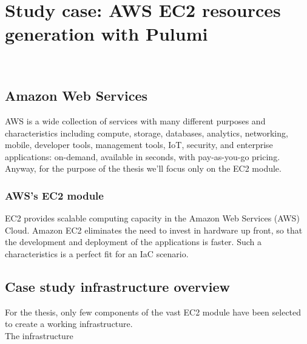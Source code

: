 
\chapter{Study case: AWS EC2 resources generation with Pulumi}
\label{cap:case-study}

\\

\section{Amazon Web Services}
AWS is a wide collection of services with many different purposes and characteristics including compute, storage, databases, analytics, networking, mobile, developer tools, management tools, IoT, security, and enterprise applications: on-demand, available in seconds, with pay-as-you-go pricing.
Anyway, for the purpose of the thesis we'll focus only on the EC2 module.

\subsection{AWS's EC2 module}
EC2 provides scalable computing capacity in the Amazon Web Services (AWS) Cloud.
Amazon EC2 eliminates the need to invest in hardware up front, so that the development and deployment of the applications is faster.
Such a characteristics is a perfect fit for an IaC scenario.

\section{Case study infrastructure overview}
For the thesis, only few components of the vast EC2 module have been selected to create a working infrastructure.\\
The infrastructure

